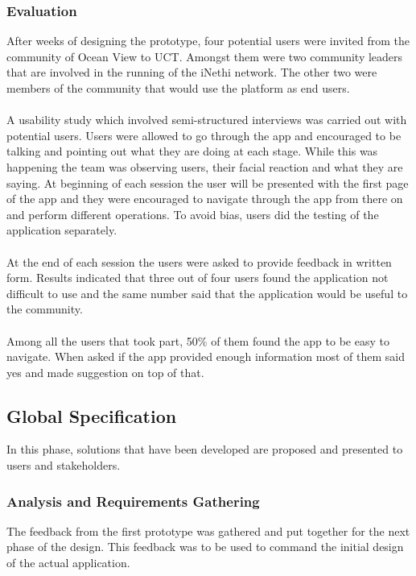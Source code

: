 \subsubsection{Evaluation}
After weeks of designing the prototype, four potential users were invited from the community of Ocean View to UCT. Amongst them were two community leaders that are involved in the running of the iNethi network. The other two were members of the community that would use the platform as end users.
\paragraph{}
A usability study which involved semi-structured interviews was carried out with potential users. Users were allowed to go through the app and encouraged to be talking and pointing out what they are doing at each stage. While this was happening the team was observing users, their facial reaction and what they are saying. At beginning of each session the user will be presented with the first page of the app and they were encouraged to navigate through the app from there on and perform different operations. To avoid bias, users did the testing of the application separately.
\paragraph{}
At the end of each session the users were asked to provide feedback in written form. Results indicated that three out of four users found the application not difficult to use and the same number said that the application would be useful to the community. 
\paragraph{}
Among all the users that took part, 50\% of them found the app to be easy to navigate. When asked if the app provided enough information most of them said yes and made suggestion on top of that.

\subsection{Global Specification}
In this phase, solutions that have been developed are proposed and presented to users and stakeholders\cite{Kulykinbook}.
\subsubsection{Analysis and Requirements Gathering}
The feedback from the first prototype was gathered and put together for the next phase of the design. This feedback was to be used to command the initial design of the actual application. 
